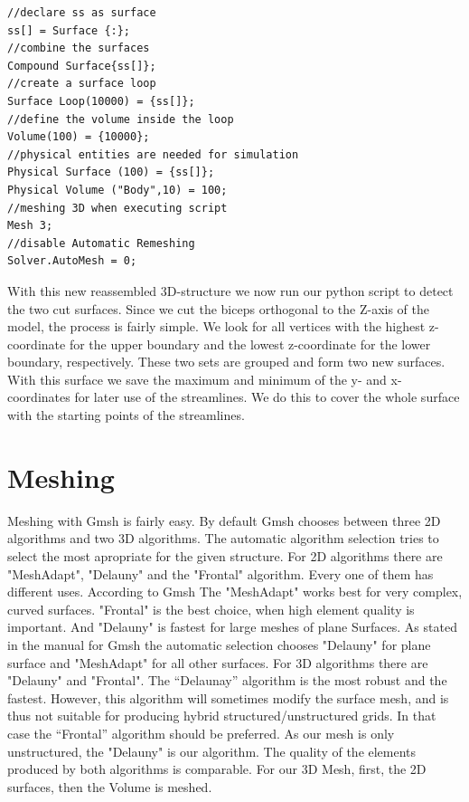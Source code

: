\documentclass[preprint,journal]{vgtc}       %
\begin{document}
\begin{verbatim}
//declare ss as surface
ss[] = Surface {:};
//combine the surfaces
Compound Surface{ss[]};
//create a surface loop
Surface Loop(10000) = {ss[]};
//define the volume inside the loop
Volume(100) = {10000};
//physical entities are needed for simulation
Physical Surface (100) = {ss[]};
Physical Volume ("Body",10) = 100;
//meshing 3D when executing script
Mesh 3;
//disable Automatic Remeshing
Solver.AutoMesh = 0;
\end{verbatim}

With this new reassembled 3D-structure we now run our python script to detect the two cut surfaces. Since we cut the biceps orthogonal to the Z-axis of the model, the process is fairly simple. We look for all vertices with the highest z-coordinate for the upper boundary and the lowest z-coordinate for the lower boundary, respectively. These two sets are grouped and form two new surfaces. With this surface we save the maximum and minimum of the y- and x- coordinates for later use of the streamlines. We do this to cover the whole surface with the starting points of the streamlines.

\section{Meshing}
Meshing with Gmsh is fairly easy. By default Gmsh chooses between three 2D algorithms and two 3D algorithms.
The automatic algorithm selection tries to select the most apropriate for the given structure.
For 2D algorithms there are "MeshAdapt", "Delauny" and the "Frontal" algorithm. Every one of them has different uses. According to Gmsh The "MeshAdapt" works best for very complex, curved surfaces. "Frontal" is the best choice, when high element quality is important. And "Delauny" is fastest for large meshes of plane Surfaces.
As stated in the manual for Gmsh the automatic selection chooses "Delauny" for plane surface and "MeshAdapt" for all other surfaces. 
For 3D algorithms there are "Delauny" and "Frontal". The “Delaunay” algorithm is the most robust and the fastest. However, this algorithm will sometimes modify the surface mesh, and is thus not suitable for producing hybrid structured/unstructured grids. In that case the “Frontal” algorithm should be preferred. As our mesh is only unstructured, the "Delauny" is our algorithm. The quality of the elements produced by both algorithms is comparable.
For our 3D Mesh, first, the 2D surfaces, then the Volume is meshed.
%	
\end{document}
